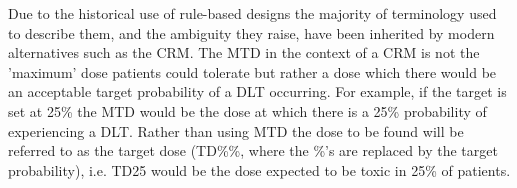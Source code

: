 Due to the historical use of rule-based designs the majority of terminology used to describe them, and the ambiguity they raise, have been inherited by modern alternatives such as the CRM. The MTD in the context of a CRM is not the 'maximum' dose patients could tolerate but rather a dose which there would be an acceptable target probability of a DLT occurring. For example, if the target is set at 25\% the MTD would be the dose at which there is a 25\% probability of experiencing a DLT. Rather than using MTD the dose to be found will be referred to as the target dose (TD\%\%, where the \%'s are replaced by the target probability), i.e. TD25 would be the dose expected to be toxic in 25\% of patients.


